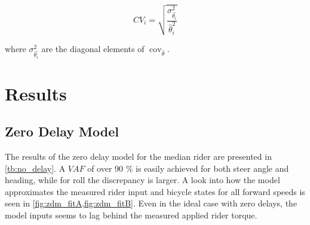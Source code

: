 \begin{equation}
    CV_{i}=\sqrt{\frac{\sigma^{2}_{\hat{\theta_i}}}{\hat{\theta}_i^2}}
    \end{equation}

    where \ensuremath{\sigma^{2}_{\hat{\theta_i}}} are the diagonal elements of \ensuremath{ \operatorname{cov}_{\hat{\theta}}}.


\section{Results}


\subsection{Zero Delay Model}
The results of the zero delay model for the median rider are presented in \cref{tb:no_delay}. A \ensuremath{\mathit{VAF}} of over 90 \% is easily achieved for both steer angle and heading, while for roll the discrepancy is larger. A  look into how the model approximates the measured rider input and bicycle states for all forward speeds is seen in \cref{fig:zdm_fitA,fig:zdm_fitB}. Even in the ideal case with zero delays, the model inputs seems to lag behind the measured applied rider torque.


